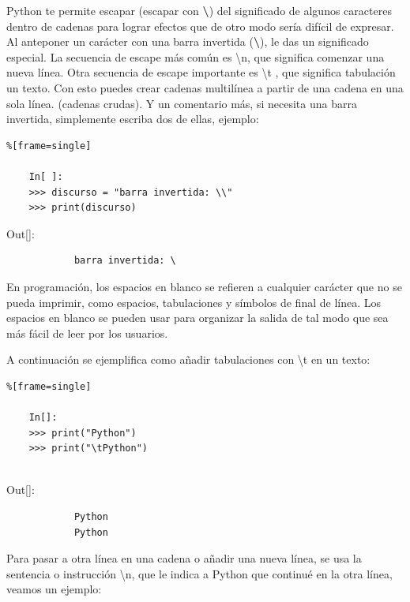 Python te permite  escapar (escapar con {\bf\scriptsize\textbackslash}) del significado de algunos caracteres dentro de cadenas para lograr efectos que de otro modo sería difícil de expresar. Al anteponer un carácter con una barra invertida ({\scriptsize \bf\textbackslash}), le das un significado especial. La secuencia de escape más común es {\ttfamily \textbackslash n},  que significa comenzar una nueva línea. Otra secuencia de escape importante es {\ttfamily \textbackslash t }, que significa tabulación un texto. Con esto puedes crear cadenas multilínea a partir de una cadena en una sola línea. (cadenas crudas). Y un comentario más, si necesita una barra invertida, 
simplemente escriba dos de ellas, ejemplo:

\begin{lstlisting}%[frame=single]
	
	In[ ]:
	>>> discurso = "barra invertida: \\" 
	>>> print(discurso)
\end{lstlisting}


{\ttfamily\scriptsize 
	\hspace{-0.65cm}Out[]:\vspace{-0.15cm}	
	{\color{blue} 	
		\begin{verbatim}		
			barra invertida: \
		\end{verbatim}
}} 

En programación, los espacios en blanco se refieren a cualquier carácter que no se pueda imprimir, como
espacios, tabulaciones y símbolos de final de línea. Los espacios en blanco se pueden usar para organizar
la salida de tal modo que sea más fácil de leer por los usuarios.

A continuación se ejemplifica como añadir tabulaciones  con {\ttfamily \textbackslash t} en un texto: 

\begin{lstlisting}%[frame=single]
	
	In[]:
	>>> print("Python")
	>>> print("\tPython")		
	
\end{lstlisting}

{\ttfamily\scriptsize\scriptsize 
	\hspace{-0.65cm}Out[]:\vspace{-0.15cm}	
	{\color{blue} 	
		\begin{verbatim}		
			Python
			Python
		\end{verbatim}
}} 

Para  pasar a otra línea en una cadena o añadir una nueva línea, se usa la sentencia o instrucción  {\ttfamily \textbackslash n}, que le indica a Python que continué en la otra línea, veamos un  ejemplo: 

